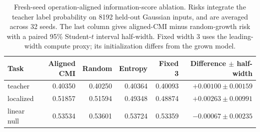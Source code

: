 \begin{table}[tb]
\centering\footnotesize\setlength{\tabcolsep}{5pt}
\caption{Fresh-seed operation-aligned information-score ablation. Risks integrate the teacher label probability on 8192 held-out Gaussian inputs, and are averaged across 32 seeds. The last column gives aligned-CMI minus random-growth risk with a paired 95\% Student-$t$ interval half-width. Fixed width 3 uses the leading-width compute proxy; its initialization differs from the grown model.}
\label{tab:aligned-probe}
\begin{tabular}{@{}lrrrrr@{}}
\toprule
Task & Aligned CMI & Random & Entropy & Fixed 3 & Difference $\pm$ half-width\\
\midrule
teacher & 0.40350 & 0.40250 & 0.40364 & 0.40093 & $+0.00100 \pm 0.00159$ \\
localized & 0.51857 & 0.51594 & 0.49348 & 0.48874 & $+0.00263 \pm 0.00991$ \\
linear null & 0.53534 & 0.53601 & 0.53724 & 0.53359 & $-0.00067 \pm 0.00235$ \\
\bottomrule
\end{tabular}
\end{table}
